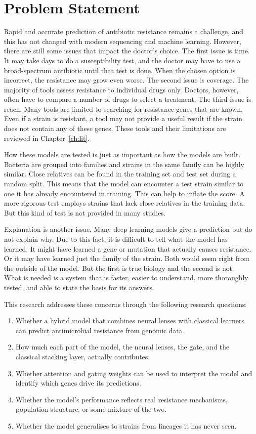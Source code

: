 \section{Problem Statement}
Rapid and accurate prediction of antibiotic resistance remains a challenge, and this has not changed with modern sequencing and machine learning. However, there are still some issues that impact the doctor's choice. The first issue is time. It may take days to do a susceptibility test, and the doctor may have to use a broad-spectrum antibiotic until that test is done. When the chosen option is incorrect, the resistance may grow even worse. The second issue is coverage. The majority of tools assess resistance to individual drugs only. Doctors, however, often have to compare a number of drugs to select a treatment. The third issue is reach. Many tools are limited to searching for resistance genes that are known. Even if a strain is resistant, a tool may not provide a useful result if the strain does not contain any of these genes. These tools and their limitations are reviewed in Chapter~\ref{ch:lit}.

How these models are tested is just as important as how the models are built. Bacteria are grouped into families and strains in the same family can be highly similar. Close relatives can be found in the training set and test set during a random split. This means that the model can encounter a test strain similar to one it has already encountered in training. This can help to inflate the score. A more rigorous test employs strains that lack close relatives in the training data. But this kind of test is not provided in many studies.

Explanation is another issue. Many deep learning models give a prediction but do not explain why. Due to this fact, it is difficult to tell what the model has learned. It might have learned a gene or mutation that actually causes resistance. Or it may have learned just the family of the strain. Both would seem right from the outside of the model. But the first is true biology and the second is not. What is needed is a system that is faster, easier to understand, more thoroughly tested, and able to state the basis for its answers.

\medskip
\noindent \sloppy
This research addresses these concerns through the following research questions:
\begin{enumerate}
  \item[RQ1:] Whether a hybrid model that combines neural lenses with classical learners can predict antimicrobial resistance from genomic data.
  \item[RQ2:] How much each part of the model, the neural lenses, the gate, and the classical stacking layer, actually contributes.
  \item[RQ3:] Whether attention and gating weights can be used to interpret the model and identify which genes drive its predictions.
  \item[RQ4:] Whether the model's performance reflects real resistance mechanisms, population structure, or some mixture of the two.
  \item[RQ5:] Whether the model generalises to strains from lineages it has never seen.
\end{enumerate}

